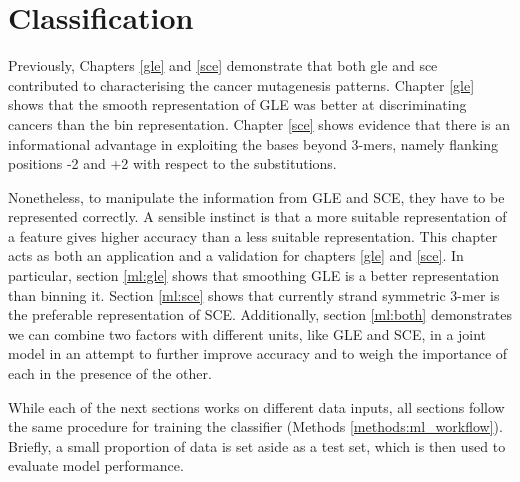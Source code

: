 \chapter{Classification}\label{ml}

Previously, Chapters \ref{gle} and \ref{sce} demonstrate that both \gls{gle} and \gls{sce} contributed to characterising the cancer mutagenesis patterns. Chapter \ref{gle} shows that the smooth representation of GLE was better at discriminating cancers than the bin representation. Chapter \ref{sce} shows evidence that there is an informational advantage in exploiting the bases beyond 3-mers, namely flanking positions -2 and +2 with respect to the substitutions. 

Nonetheless, to manipulate the information from GLE and SCE, they have to be represented correctly. A sensible instinct is that a more suitable representation of a feature gives higher accuracy than a less suitable representation. This chapter acts as both an application and a validation for chapters \ref{gle} and \ref{sce}. In particular, section \ref{ml:gle} shows that smoothing GLE is a better representation than binning it. Section \ref{ml:sce} shows that currently strand symmetric 3-mer is the preferable representation of SCE. Additionally, section \ref{ml:both} demonstrates we can combine two factors with different units, like GLE and SCE, in a joint model in an attempt to further improve accuracy and to weigh the importance of each in the presence of the other.

While each of the next sections works on different data inputs, all sections follow the same procedure for training the classifier (Methods \ref{methods:ml_workflow}). Briefly, a small proportion of data is set aside as a test set, which is then used to evaluate model performance.

